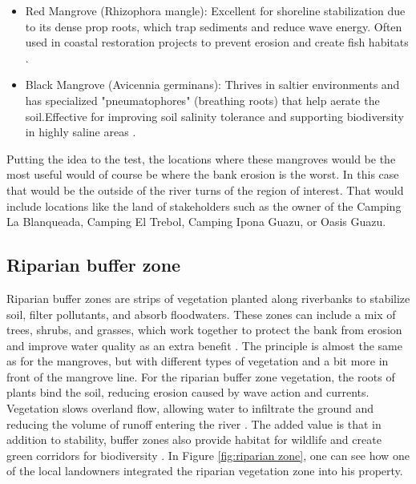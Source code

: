 \begin{itemize}
    \item Red Mangrove (Rhizophora mangle): Excellent for shoreline stabilization due to its dense prop roots, which trap sediments and reduce wave energy. Often used in coastal restoration projects to prevent erosion and create fish habitats \autocite{HowLongDoes2021}.
    \item Black Mangrove (Avicennia germinans): Thrives in saltier environments and has specialized "pneumatophores" (breathing roots) that help aerate the soil.Effective for improving soil salinity tolerance and supporting biodiversity in highly saline areas \autocite{nickhammondWhatBlackMangrove}.
\end{itemize}

Putting the idea to the test, the locations where these mangroves would be the most useful would of course be where the bank erosion is the worst. In this case that would be the outside of the river turns of the region of interest. That would include locations like the land of stakeholders such as the owner of the Camping La Blanqueada, Camping El Trebol, Camping Ipona Guazu, or Oasis Guazu.

\subsection{Riparian buffer zone}
Riparian buffer zones are strips of vegetation planted along riverbanks to stabilize soil, filter pollutants, and absorb floodwaters. These zones can include a mix of trees, shrubs, and grasses, which work together to protect the bank from erosion and improve water quality as an extra benefit \autocite{ukforestrystandardCreatingManagingRiparian2024}. The principle is almost the same as for the mangroves, but with different types of vegetation and a bit more in front of the mangrove line. For the riparian buffer zone vegetation, the roots of plants bind the soil, reducing erosion caused by wave action and currents. Vegetation slows overland flow, allowing water to infiltrate the ground and reducing the volume of runoff entering the river \autocite{naturetrustUnderstandingVitalRole2024}. The added value is that in addition to stability, buffer zones also provide habitat for wildlife and create green corridors for biodiversity \autocite{vagheeiFreshwaterRiparianZones2025}. In Figure \ref{fig:riparian zone}, one can see how one of the local landowners integrated the riparian vegetation zone into his property.


